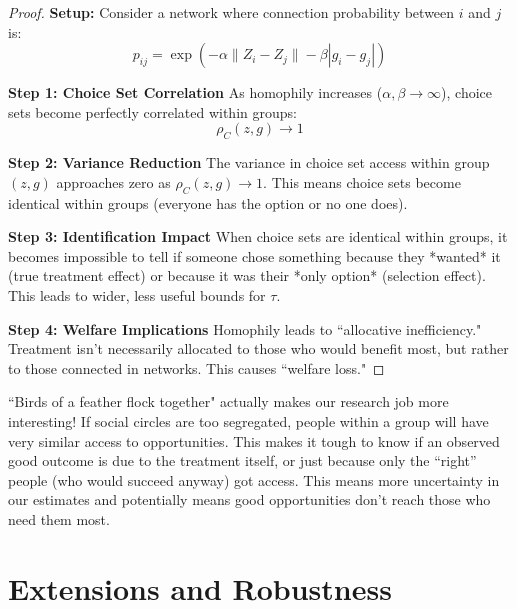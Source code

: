 \documentclass{article}
\begin{document}
\begin{proof}
\textbf{Setup:} Consider a network where connection probability between $i$ and $j$ is:
\begin{equation}
p_{ij} = \exp(-\alpha \|Z_i - Z_j\| - \beta |g_i - g_j|) %
\end{equation}

\textbf{Step 1: Choice Set Correlation}
As homophily increases ($\alpha, \beta \to \infty$), choice sets become perfectly correlated within groups:
\begin{equation}
\rho_{C}(z,g) \to 1 %
\end{equation}

\textbf{Step 2: Variance Reduction}
The variance in choice set access within group $(z,g)$ approaches zero as $\rho_C(z,g) \to 1$. This means choice sets become identical within groups (everyone has the option or no one does).

\textbf{Step 3: Identification Impact}
When choice sets are identical within groups, it becomes impossible to tell if someone chose something because they *wanted* it (true treatment effect) or because it was their *only option* (selection effect). This leads to wider, less useful bounds for $\tau$.

\textbf{Step 4: Welfare Implications}
Homophily leads to ``allocative inefficiency." Treatment isn't necessarily allocated to those who would benefit most, but rather to those connected in networks. This causes ``welfare loss."
\end{proof}

\begin{tcolorbox}[mycommentbox,title=homophily is bad for identification]
``Birds of a feather flock together" actually makes our research job more interesting! If social circles are too segregated, people within a group will have very similar access to opportunities. This makes it tough to know if an observed good outcome is due to the treatment itself, or just because only the ``right'' people (who would succeed anyway) got access. This means more uncertainty in our estimates and potentially means good opportunities don't reach those who need them most.
\end{tcolorbox}

\section{Extensions and Robustness}
\end{document}
